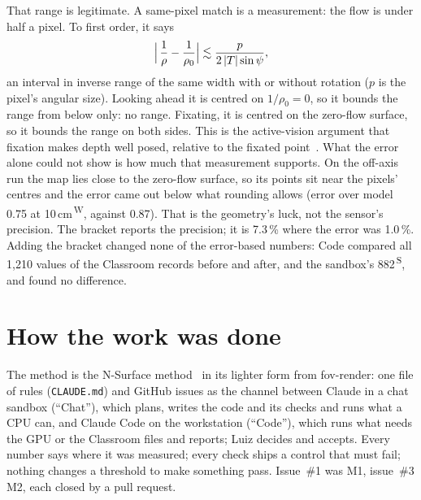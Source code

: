 \documentclass[11pt,a4paper]{article}
\newcommand{\code}[1]{\texttt{\small #1}}
\newcommand{\src}[1]{\textsuperscript{\,#1}}
\newcommand{\WS}{\src{W}}   %
\newcommand{\SB}{\src{S}}   %
\begin{document}
That range is legitimate. A same-pixel match is a measurement: the flow is under half a pixel. To first order, it says
\begin{equation}\label{eq:interval}
  \Bigl|\,\frac{1}{\rho}-\frac{1}{\rho_0}\Bigr| \lesssim \frac{p}{2\,|T|\sin\psi},
\end{equation}
an interval in inverse range of the same width with or without rotation ($p$ is the pixel's angular size). Looking ahead
it is centred on $1/\rho_0=0$, so it bounds the range from below only: no range. Fixating, it is centred on the zero-flow
surface, so it bounds the range on both sides. This is the active-vision argument that fixation makes depth well posed,
relative to the fixated point~\cite{aloimonos,ballard}. What the error alone could not show is how much that measurement
supports. On the off-axis run the map lies close to the zero-flow surface, so its points sit near the pixels' centres
and the error came out below what rounding allows (error over model 0.75 at 10\,cm\WS, against 0.87). That is the
geometry's luck, not the sensor's precision. The bracket reports the precision; it is 7.3\,\% where the error was
1.0\,\%. Adding the bracket changed none of the error-based numbers: Code compared all 1{,}210 values of the Classroom
records before and after, and the sandbox's 882\SB, and found no difference.

\section{How the work was done}\label{sec:process}

The method is the N-Surface method~\cite{nsurface} in its lighter form from fov-render: one file of rules
(\code{CLAUDE.md}) and GitHub issues as the channel between Claude in a chat sandbox (``Chat''), which plans, writes the
code and its checks and runs what a CPU can, and Claude Code on the workstation (``Code''), which runs what needs the
GPU or the Classroom files and reports; Luiz decides and accepts. Every number says where it was measured; every check
ships a control that must fail; nothing changes a threshold to make something pass. Issue~\#1 was M1, issue~\#3 M2,
each closed by a pull request.
\end{document}
